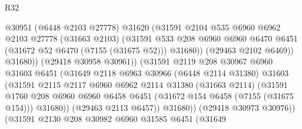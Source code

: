 \begin{lexlean}{R32}
\begin{coremodule}
                                  @30951
                                  (@6448 @2103 @27778)
                                  @31620
                                  (@31591
                                    @2104
                                    @535
                                    @6960
                                    @6962
                                    @2103
                                    @27778
                                    (@31663 @2103)
                                    (@31591
                                      @533
                                      @208
                                      @6960
                                      @6960
                                      @6470
                                      @6451
                                      (@31672 @52 @6470 (@7155 (@31675 @52)))
                                      @31680))
                                  (@29463 @2102 @6469))
                                @31680))
                            (@29418 @30958 @30961))
                          (@31591
                            @2119
                            @208
                            @30967
                            @6960
                            @31603
                            @6451
                            (@31649
                              @2118
                              @6963
                              @30966
                              (@6448 @2114 @31380)
                              @31603
                              (@31591
                                @2115
                                @2117
                                @6960
                                @6962
                                @2114
                                @31380
                                (@31663 @2114)
                                (@31591
                                  @1760
                                  @208
                                  @6960
                                  @6960
                                  @6458
                                  @6451
                                  (@31672 @154 @6458 (@7155 (@31675 @154)))
                                  @31680))
                              (@29463 @2113 @6457))
                            @31680))
                        (@29418 @30973 @30976))
                      (@31591
                        @2130
                        @208
                        @30982
                        @6960
                        @31585
                        @6451
                        (@31649

\end{coremodule}
\end{lexlean}
